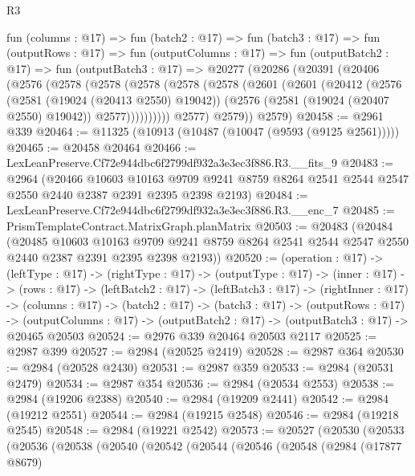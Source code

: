 \begin{lexlean}{R3}
\begin{coremodule}
  fun (columns : @17) =>
  fun (batch2 : @17) =>
  fun (batch3 : @17) =>
  fun (outputRows : @17) =>
  fun (outputColumns : @17) =>
  fun (outputBatch2 : @17) =>
  fun (outputBatch3 : @17) =>
  @20277
    (@20286
      (@20391
        (@20406
          (@2576
            (@2578
              (@2578
                (@2578
                  (@2578
                    (@2578
                      (@2601
                        (@2601
                          (@20412
                            (@2576
                              (@2581 (@19024 (@20413 @2550) @19042))
                              (@2576 (@2581 (@19024 (@20407 @2550) @19042)) @2577))))))))))
            @2577)
          @2579))
      @2579)
@20458 := @2961 @339
@20464 := @11325 (@10913 (@10487 (@10047 (@9593 (@9125 @2561)))))
@20465 := @20458 @20464
@20466 := LexLeanPreserve.Cf72e944dbc6f2799df932a3e3ec3f886.R3.__fits_9
@20483 := @2964
    (@20466
      @10603
      @10163
      @9709
      @9241
      @8759
      @8264
      @2541
      @2544
      @2547
      @2550
      @2440
      @2387
      @2391
      @2395
      @2398
      @2193)
@20484 := LexLeanPreserve.Cf72e944dbc6f2799df932a3e3ec3f886.R3.__enc_7
@20485 := PrismTemplateContract.MatrixGraph.planMatrix
@20503 := @20483
    (@20484
      (@20485
        @10603
        @10163
        @9709
        @9241
        @8759
        @8264
        @2541
        @2544
        @2547
        @2550
        @2440
        @2387
        @2391
        @2395
        @2398
        @2193))
@20520 := (operation : @17) ->
  (leftType : @17) ->
  (rightType : @17) ->
  (outputType : @17) ->
  (inner : @17) ->
  (rows : @17) ->
  (leftBatch2 : @17) ->
  (leftBatch3 : @17) ->
  (rightInner : @17) ->
  (columns : @17) ->
  (batch2 : @17) ->
  (batch3 : @17) ->
  (outputRows : @17) ->
  (outputColumns : @17) -> (outputBatch2 : @17) -> (outputBatch3 : @17) -> @20465 @20503
@20524 := @2976 @339 @20464 @20503 @2117
@20525 := @2987 @399
@20527 := @2984 (@20525 @2419)
@20528 := @2987 @364
@20530 := @2984 (@20528 @2430)
@20531 := @2987 @359
@20533 := @2984 (@20531 @2479)
@20534 := @2987 @354
@20536 := @2984 (@20534 @2553)
@20538 := @2984 (@19206 @2388)
@20540 := @2984 (@19209 @2441)
@20542 := @2984 (@19212 @2551)
@20544 := @2984 (@19215 @2548)
@20546 := @2984 (@19218 @2545)
@20548 := @2984 (@19221 @2542)
@20573 := @20527
    (@20530
      (@20533
        (@20536
          (@20538
            (@20540
              (@20542
                (@20544
                  (@20546
                    (@20548
                      (@2984
                        (@17877 @8679)

\end{coremodule}
\end{lexlean}
